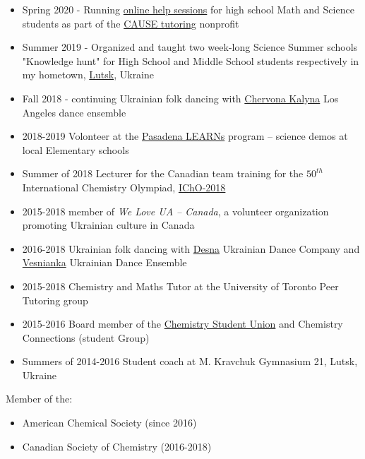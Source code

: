 \documentclass[9pt, margin]{res}
\begin{document}
\begin{resume}
\begin{itemize}
	\item Spring 2020 - Running \href{https://causetutoring.org/online-extra-help-sessions-during-covid-19/}{online help sessions} for high school Math and Science students as part of the \href{https://causetutoring.org/}{CAUSE tutoring} nonprofit
	\item Summer 2019 - Organized and taught two week-long Science Summer schools "Knowledge hunt" for High School and Middle School students respectively in my hometown, \href{https://en.wikipedia.org/wiki/Lutsk}{Lutsk}, Ukraine
	\item Fall 2018 - continuing Ukrainian folk dancing with \href{https://kalyna.org/}{Chervona Kalyna} Los Angeles dance ensemble
	\item 2018-2019 Volonteer at the \href{https://www.caltechy.org/single-post/2019/05/01/Caltech-Y-Volunteers-Make-Science-Exciting-at-Elementary-School}{Pasadena LEARNs} program -- science demos at local Elementary schools
	\item Summer of 2018 Lecturer for the Canadian team training for the $50^{th}$ International Chemistry Olympiad, \href{https://50icho.eu}{IChO-2018} 
	\item 2015-2018 member of \textit{We Love UA -- Canada}, a volunteer organization promoting Ukrainian culture in Canada
	\item 2016-2018 Ukrainian folk dancing with \href{http://www.desna.ca}{Desna} Ukrainian Dance Company and \href{http://www.infoukes.com/vesnianka/}{Vesnianka} Ukrainian Dance Ensemble
	\item 2015-2018 Chemistry and Maths Tutor at the University of Toronto Peer Tutoring group 
	\item 2015-2016 Board member of the \href{http://csu.sa.utoronto.ca/exceutive-team-2015-2016/}{Chemistry Student Union} and Chemistry Connections (student Group)
	\item Summers of 2014-2016 Student coach at M. Kravchuk Gymnasium 21, Lutsk, Ukraine
\end{itemize}
Member of the:
\begin{itemize}
	\item American Chemical Society (since 2016)
	\item Canadian Society of Chemistry (2016-2018)
\end{itemize}

\end{resume}
\end{document}
